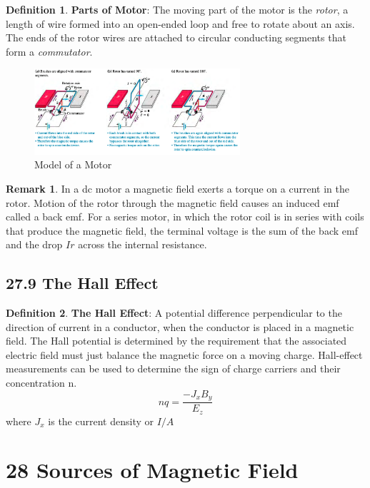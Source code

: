 \documentclass[12pt]{amsart}
\theoremstyle{definition}
\newtheorem{definition}{Definition} %
\newtheorem*{remark}{Remark}        %
\numberwithin{equation}{theorem}    %
\begin{document}
\begin{definition}
    \textbf{Parts of Motor}:
    The moving part of the motor is the \textit{rotor}, a length of wire formed into an open-ended loop and free to rotate about an axis. The ends of the rotor wires are attached to circular conducting segments that form a \textit{commutator}.
\end{definition}
\begin{figure}[H]
    \centering
    \includegraphics[width=3in]{Media/motor.png}
    \caption{Model of a Motor}
    \label{Model of a Motor}
\end{figure}
\begin{remark}
    In a dc motor a magnetic field exerts a torque on a current in the rotor. Motion of the rotor through the magnetic field causes an induced emf called a back emf. For a series motor, in which the rotor coil is in series with coils that produce the magnetic field, the terminal voltage is the sum of the back emf and the drop $Ir$ across the internal resistance.
\end{remark}

\subsection*{27.9 The Hall Effect}

\begin{definition}
    \textbf{The Hall Effect}:
    A potential difference perpendicular to the direction of current in a conductor, when the conductor is placed in a magnetic field. The Hall potential is determined by the requirement that the associated electric field must just balance the magnetic force on a moving charge. Hall-effect measurements can be used to determine the sign of charge carriers and their concentration n. 
    $$nq=\frac{-J_xB_y}{E_z}$$ where $J_x$ is the current density or $I/A$


\end{definition}


\section*{28 Sources of Magnetic Field}
\end{document}
